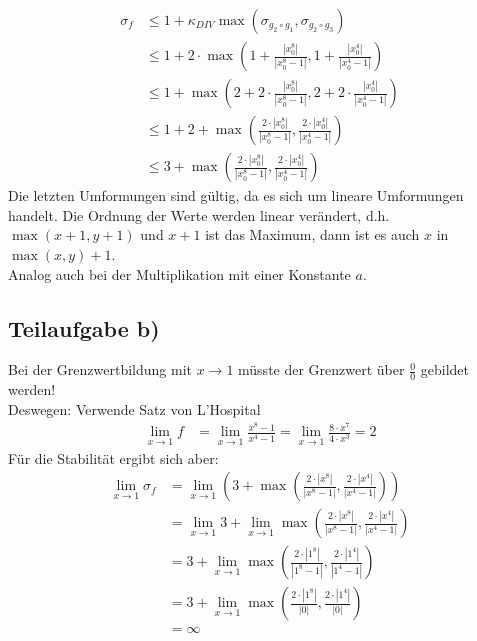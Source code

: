 \documentclass{llncs}
\begin{document}
\begin{align*}
\sigma_{f}
&\le 1 +\kappa_{DIV} \max (\sigma_{g_2\circ g_1},\sigma_{g_2\circ g_3})\\
&\le 1 + 2\cdot \max \left(1 + \frac{|x_0^8|}{|x_0^8-1|},1 + \frac{|x_0^4|}{|x_0^4-1|}\right)\\
&\le 1  + \max \left(2 + 2\cdot\frac{|x_0^8|}{|x_0^8-1|},2 + 2\cdot\frac{|x_0^4|}{|x_0^4-1|}\right)\\
&\le 1 + 2+ \max \left(\frac{ 2\cdot|x_0^8|}{|x_0^8-1|}, \frac{2\cdot|x_0^4|}{|x_0^4-1|}\right)\\
&\le 3+ \max \left( \frac{ 2\cdot|x_0^8|}{|x_0^8-1|}, \frac{2\cdot|x_0^4|}{|x_0^4-1|}\right)
\end{align*}
Die letzten Umformungen sind gültig, da es sich um lineare Umformungen handelt. Die Ordnung der Werte werden linear verändert, d.h. $\max(x+1,y+1)$ und $x+1$ ist das Maximum, dann ist es auch $x$ in $\max (x,y)+1$. \\
Analog auch bei der Multiplikation mit einer Konstante $a$.
\subsection*{Teilaufgabe b)}
Bei der Grenzwertbildung mit $x \rightarrow 1$ müsste der Grenzwert über $\frac{0}{0}$ gebildet werden!\\
Deswegen: Verwende Satz von L'Hospital
\begin{align*}
\lim_{x \rightarrow 1} f &= \lim_{x \rightarrow 1} \frac{x^8-1}{x^4-1} =\lim_{x \rightarrow 1}\frac{8 \cdot x^7}{4 \cdot x^3}=2
\end{align*}
Für die Stabilität ergibt sich aber:
\begin{align*}
\lim_{x \rightarrow 1} \sigma_{f} 
&= \lim_{x \rightarrow 1} (3+ \max \left( \frac{ 2\cdot|x^8|}{|x^8-1|}, \frac{2\cdot|x^4|}{|x^4-1|}\right )) \\
&= \lim_{x \rightarrow 1} 3+\lim_{x \rightarrow 1} \max \left( \frac{ 2\cdot|x^8|}{|x^8-1|}, \frac{2\cdot|x^4|}{|x^4-1|}\right) \\
&= 3+ \lim_{x \rightarrow 1}\max \left( \frac{ 2\cdot|1^8|}{|1^8-1|}, \frac{2\cdot|1^4|}{|1^4-1|}\right)\\
&= 3+ \lim_{x \rightarrow 1}\max \left( \frac{ 2\cdot|1^8|}{|0|}, \frac{2\cdot|1^4|}{|0|}\right)\\
&= \infty
\end{align*}
\end{document}

